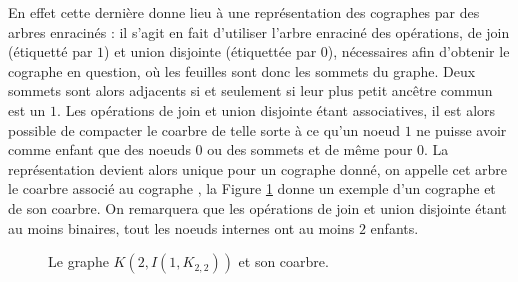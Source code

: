 \documentclass{scrartcl}
\begin{document}
\begin{flushleft}
En effet cette dernière donne lieu à une représentation des cographes par des arbres enracinés : il s'agit en fait d'utiliser l'arbre
enraciné des opérations, de join (étiquetté par $1$) et union disjointe (étiquettée par $0$), nécessaires afin d'obtenir le cographe en question,
où les feuilles sont donc les sommets du graphe. Deux sommets sont alors adjacents si et seulement si leur plus petit ancêtre commun est un $1$.
Les opérations de join et union disjointe étant associatives, il est alors possible de compacter le coarbre de telle sorte à ce qu'un noeud
$1$ ne puisse avoir comme enfant que des noeuds $0$ ou des sommets et de même pour $0$. La représentation devient alors unique pour un cographe
donné, on appelle cet arbre le coarbre associé au cographe \cite{cotrees}, la Figure \ref{excographe} donne un exemple d'un cographe et de
son coarbre. On remarquera que les opérations de join et union disjointe étant au moins binaires, tout les noeuds internes ont au moins
$2$ enfants. 

\begin{figure}[h]
    \caption{Le graphe $K(2,I(1,K_{2,2}))$ et son coarbre.}\label{excographe}
    \vspace*{0.5cm}
    \begin{center}
\end{center}
\end{figure}
\end{flushleft}
\end{document}
